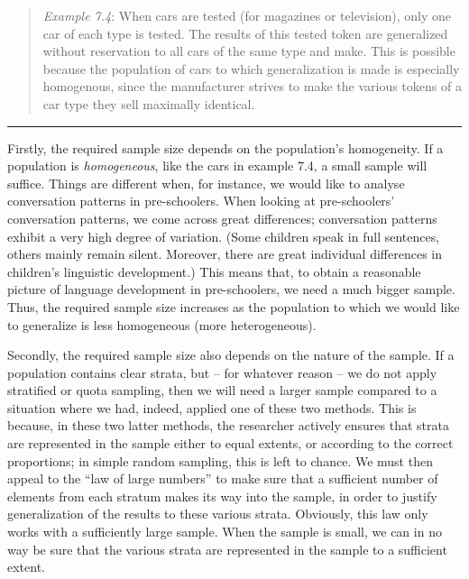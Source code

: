 \documentclass[
]{book}
\begin{document}
\begin{quote}
\emph{Example 7.4}: When cars are tested (for magazines or television), only one car of each type is tested. The results of this tested token are generalized without reservation to all cars of the same type and make. This is possible because the population of cars to which generalization is made is especially homogenous, since the manufacturer strives to make the various tokens of a car type they sell maximally identical.
\end{quote}

\begin{center}\rule{0.5\linewidth}{0.5pt}\end{center}

Firstly, the required sample size depends on the population's homogeneity. If a population is \emph{homogeneous}, like the cars in example 7.4, a small sample will suffice. Things are different when, for instance, we would like to analyse conversation patterns in pre-schoolers. When looking at pre-schoolers' conversation patterns, we come across great differences; conversation patterns exhibit a very high degree of variation. (Some children speak in full sentences, others mainly remain silent. Moreover, there are great individual differences in children's linguistic development.) This means that, to obtain a reasonable picture of language development in pre-schoolers, we need a much bigger sample. Thus, the required sample size increases as the population to which we would like to generalize is less homogeneous (more heterogeneous).

Secondly, the required sample size also depends on the nature of the sample. If a population contains clear strata, but -- for whatever reason -- we do not apply stratified or quota sampling, then we will need a larger sample compared to a situation where we had, indeed, applied one of these two methods. This is because, in these two latter methods, the researcher actively ensures that strata are represented in the sample either to equal extents, or according to the correct proportions; in simple random sampling, this is left to chance. We must then appeal to the ``law of large numbers'' to make sure that a sufficient number of elements from each stratum makes its way into the sample, in order to justify generalization of the results to these various strata. Obviously, this law only works with a sufficiently large sample. When the sample is small, we can in no way be sure that the various strata are represented in the sample to a sufficient extent.
\end{document}
